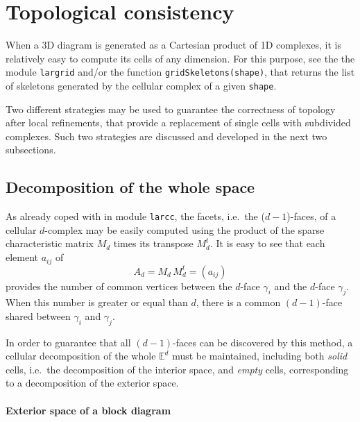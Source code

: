 \documentclass[11pt,oneside]{article}	%
\def\E{\mathbb{E}}
\begin{document}
\section{Topological consistency}

When a 3D diagram is generated as a Cartesian product of 1D complexes, it is relatively easy to 
compute its cells of any dimension. For this purpose, see the the module \texttt{largrid}
and/or the function \texttt{gridSkeletons(shape)}, that returns the list of skeletons 
generated by the cellular complex of a given \texttt{shape}.

Two different strategies may be used to guarantee the correctness of topology after
local refinements, that provide a replacement of single cells with subdivided complexes. Such two 
strategies are 
discussed and developed in the next two subsections.

\subsection{Decomposition of the whole space}
As already coped with in module \texttt{larcc}, the facets, i.e.~the ($d-1$)-faces, 
of a cellular $d$-complex may be easily computed using the product of the sparse 
characteristic matrix $M_d$ times its transpose $M_d^t$. It is easy to see that 
each element $a_{ij}$ of 
\[
A_d = M_d\, M_d^t = (a_{ij})
\] 
provides the number of common vertices between the $d$-face $\gamma_i$ and the 
$d$-face $\gamma_j$. When this number is greater or equal than $d$, there is a common
$(d-1)$-face shared between $\gamma_i$ and $\gamma_j$.

In order to guarantee that all $(d-1)$-faces can be discovered by this method, a 
cellular decomposition of the whole $\E^d$ must be maintained, including both \emph{solid} cells,
i.e.~the decomposition of the interior space, and \emph{empty} cells, corresponding to a 
decomposition of the exterior space.

\paragraph{Exterior space of a block diagram}
\end{document}
